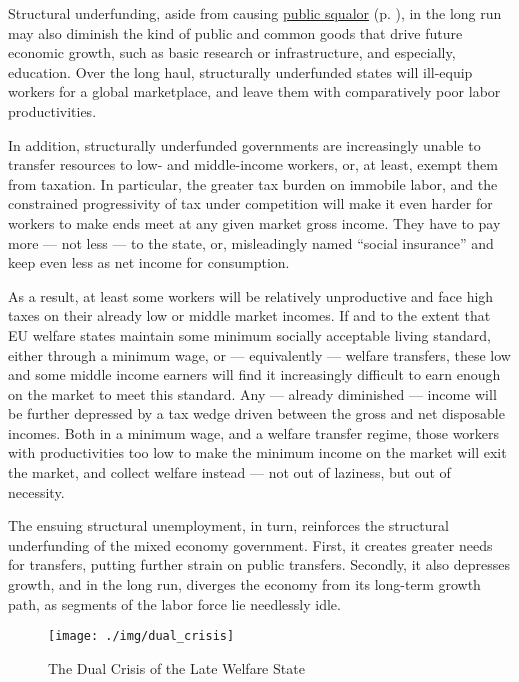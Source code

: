\documentclass[11pt,a4paper,oneside,openright]{article}
\begin{document}
Structural underfunding, aside from causing \hyperref[sec:public_squalor]{public squalor} (p. \pageref{sec:public_squalor}), in the long run may also diminish the kind of public and common goods that drive future economic growth, such as basic research or infrastructure, and especially, education. Over the long haul, structurally underfunded states will ill-equip workers for a global marketplace, and leave them with comparatively poor labor productivities.

In addition, structurally underfunded governments are increasingly unable to transfer resources to low- and middle-income workers, or, at least, exempt them from taxation. In particular, the greater tax burden on immobile labor, and the constrained progressivity of tax under competition will make it even harder for workers to make ends meet at any given market gross income. They have to pay more --- not less --- to the state, or, misleadingly named ``social insurance'' and keep even less as net income for consumption.

As a result, at least some workers will be relatively unproductive and face high taxes on their already low or middle market incomes. If and to the extent that \gls{EU} welfare states maintain some minimum socially acceptable living standard, either through a minimum wage, or --- equivalently --- welfare transfers, these low and some middle income earners will find it increasingly difficult to earn enough on the market to meet this standard. Any --- already diminished --- income will be further depressed by a tax wedge driven between the gross and net disposable incomes. Both in a minimum wage, and a welfare transfer regime, those workers with productivities too low to make the minimum income on the market will exit the market, and collect welfare instead --- not out of laziness, but out of necessity. 

The ensuing structural unemployment, in turn, reinforces the structural underfunding of the mixed economy government. First, it creates greater needs for transfers, putting further strain on public transfers. Secondly, it also depresses growth, and in the long run, diverges the economy from its long-term growth path, as segments of the labor force lie needlessly idle.

\begin{figure}[htbp]
	\begin{center}
	\texttt{[image: ./img/dual\_crisis]}  
	\caption{The Dual Crisis of the Late Welfare State}
	\label{fig:dual_crisis}
	\end{center}
\end{figure} %
\end{document}
